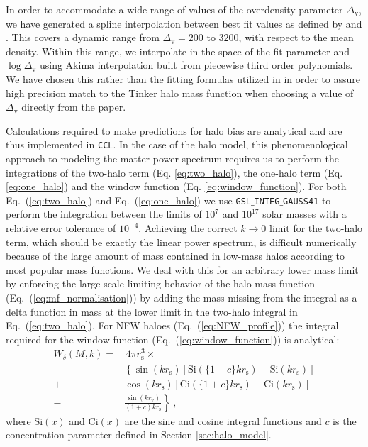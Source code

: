 \documentclass[\docopts]{\docclass}
\newcommand{\ccl}{{\tt CCL}\xspace}
\begin{document}
In order to accommodate a wide range of values of the overdensity parameter $\Delta_\mathrm{v}$, we have generated a spline interpolation between best fit values as defined by \citet{Tinker2008} and \citet{Tinker2010}. This covers a dynamic range from $\Delta_\mathrm{v}=200$ to $3200$, with respect to the mean density. Within this range, we interpolate in the space of the fit parameter and $\log\Delta_\mathrm{v}$ using Akima interpolation built from piecewise third order polynomials. We have chosen this rather than the fitting formulas utilized in \citet{Tinker2010} in order to assure high precision match to the Tinker halo mass function when choosing a value of $\Delta_\mathrm{v}$ directly from the paper. 

Calculations required to make predictions for halo bias are analytical and are thus implemented in \ccl. In the case of the halo model, this phenomenological approach to modeling the matter power spectrum requires us to perform the integrations of the two-halo term (Eq. \ref{eq:two_halo}), the one-halo term (Eq. \ref{eq:one_halo}) and the window function (Eq. \ref{eq:window_function}). For both Eq.~(\ref{eq:two_halo}) and Eq.~(\ref{eq:one_halo}) we use {\tt GSL$\_$INTEG$\_$GAUSS41} to perform the integration between the limits of $10^{7}$ and $10^{17}$ solar masses with a relative error tolerance of $10^{-4}$. Achieving the correct $k\to0$ limit for the two-halo term, which should be exactly the linear power spectrum, is difficult numerically because of the large amount of mass contained in low-mass halos according to most popular mass functions. We deal with this for an arbitrary lower mass limit by enforcing the large-scale limiting behavior of the halo mass function (Eq.~(\ref{eq:mf_normalisation})) by adding the mass missing from the integral as a delta function in mass at the lower limit in the two-halo integral in Eq.~(\ref{eq:two_halo}). For NFW haloes (Eq.~(\ref{eq:NFW_profile})) the integral required for the window function (Eq.~(\ref{eq:window_function})) is analytical:
\begin{equation}
\begin{split}
W_\delta(M,k) = &\, 4\pi r_\mathrm{s}^3 \times \\
& \left\{\sin(kr_\mathrm{s})\left[\mathrm{Si}(\{1+c\}kr_\mathrm{s})-\mathrm{Si}(kr_\mathrm{s})\right]\right. \\
+ & \cos(kr_\mathrm{s})\left[\mathrm{Ci}(\{1+c\}kr_\mathrm{s})-\mathrm{Ci}(kr_\mathrm{s})\right] \\
- & \left.\frac{\sin(kr_\mathrm{v})}{(1+c)kr_\mathrm{s}}\right\}\ ,
\label{eq:NFW_Fourier}
\end{split}
\end{equation}
where $\mathrm{Si}(x)$ and $\mathrm{Ci}(x)$ are the sine and cosine integral functions and $c$ is the concentration parameter defined in Section \ref{sec:halo_model}.
\end{document}
